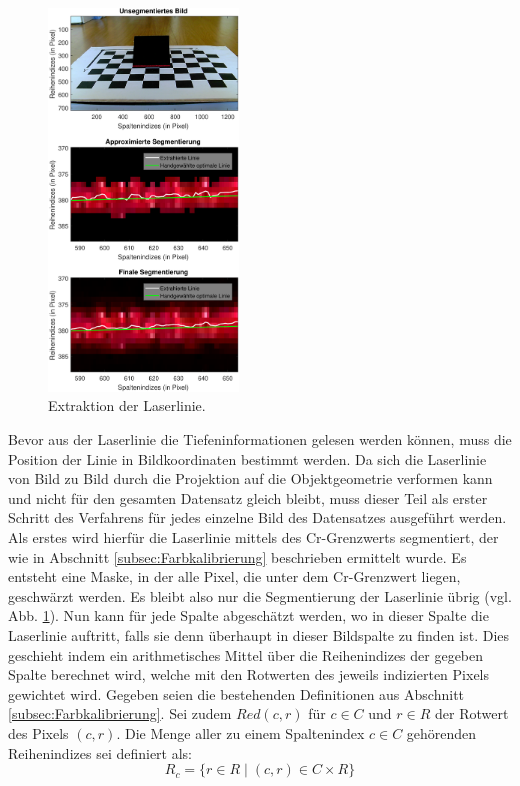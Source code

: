\begin{figure}
\centering \includegraphics[width=0.45\textwidth]{images/Segmentierung.pdf}
\caption[Extraktion der Laserlinie]{Extraktion der Laserlinie.}\label{fig:LaserLinieExtraktion}
\end{figure}
\leavevmode

Bevor aus der Laserlinie die Tiefeninformationen gelesen werden können, muss die Position der Linie in Bildkoordinaten bestimmt werden. Da sich die Laserlinie von Bild zu Bild durch die Projektion auf die Objektgeometrie verformen kann und nicht für den gesamten Datensatz gleich bleibt, muss dieser Teil als erster Schritt des Verfahrens für jedes einzelne Bild des Datensatzes ausgeführt werden. Als erstes wird hierfür die Laserlinie mittels des Cr-Grenzwerts segmentiert, der wie in Abschnitt \ref{subsec:Farbkalibrierung} beschrieben ermittelt wurde. Es entsteht eine Maske, in der alle Pixel, die unter dem Cr-Grenzwert liegen, geschwärzt werden. Es bleibt also nur die Segmentierung der Laserlinie übrig (vgl. Abb. \ref{fig:LaserLinieExtraktion}). Nun kann für jede Spalte abgeschätzt werden, wo in dieser Spalte die Laserlinie auftritt, falls sie denn überhaupt in dieser Bildspalte zu finden ist. Dies geschieht indem ein arithmetisches Mittel über die Reihenindizes der gegeben Spalte berechnet wird, welche mit den Rotwerten des jeweils indizierten Pixels gewichtet wird. Gegeben seien die bestehenden Definitionen aus Abschnitt \ref{subsec:Farbkalibrierung}. Sei zudem \(Red(c,r)\) für \(c \in C\) und \(r \in R\) der Rotwert des Pixels \((c,r)\). Die Menge aller zu einem Spaltenindex \(c \in C\) gehörenden Reihenindizes sei definiert als:
\begin{equation}
R_{c} = \lbrace r \in R \mid (c, r) \in C \times R \rbrace
\end{equation}

